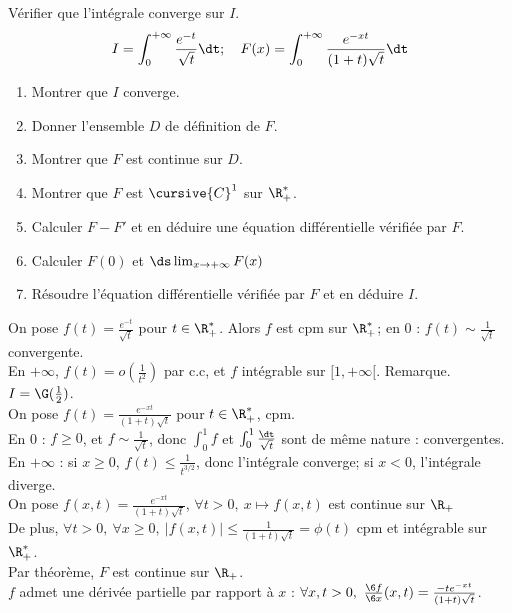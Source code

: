 \documentclass[11pt]{article}
\begin{document}
\begin{ex}{}{}
    Vérifier que l'intégrale converge sur $I$.
    \begin{equation*}
        I=\int_0^{+\infty}\frac{e^{-t}}{\sqrt{t}}\dt; \quad F(x)=\int_0^{+\infty}\frac{e^{-xt}}{(1+t)\sqrt{t}}\dt
    \end{equation*}
    \begin{enumerate}
        \item Montrer que $I$ converge.
        \item Donner l'ensemble $D$ de définition de $F$.
        \item Montrer que $F$ est continue sur $D$.
        \item Montrer que $F$ est $\cursive{C}^1$ sur $\R_+^*$.
        \item Calculer $F-F'$ et en déduire une équation différentielle vérifiée par $F$.  
        \item Calculer $F(0)$ et $\ds\lim_{x\to+\infty} F(x)$
        \item Résoudre l'équation différentielle vérifiée par $F$ et en déduire $I$.
    \end{enumerate}
    \tcblower
     On pose $f(t)=\frac{e^{-t}}{\sqrt{t}}$ pour $t\in\R_+^*$. Alors $f$ est cpm sur $\R_+^*$; en 0 : $f(t)\sim\frac{1}{\sqrt{t}}$ convergente.\\
    En $+\infty$, $f(t)=o(\frac{1}{t^2})$ par c.c, et $f$ intégrable sur $[1,+\infty[$. Remarque. $I=\G(\frac{1}{2})$.\\
     On pose $f(t)=\frac{e^{-xt}}{(1+t)\sqrt{t}}$ pour $t\in\R_+^*$, cpm.\\
    En 0 : $f\geq0$, et $f\sim\frac{1}{\sqrt{t}}$, donc $\int_0^1 f$ et $\int_0^1\frac{\dt}{\sqrt{t}}$ sont de même nature : convergentes.\\
    En $+\infty$ : si $x\geq0$, $f(t)\leq\frac{1}{t^{3/2}}$, donc l'intégrale converge; si $x<0$, l'intégrale diverge.\\
     On pose $f(x,t)=\frac{e^{-xt}}{(1+t)\sqrt{t}}$, $\forall t > 0, ~ x\mapsto f(x,t)$ est continue sur $\R_+$\\
    De plus, $\forall t>0, ~ \forall x \geq 0, ~ |f(x,t)|\leq\frac{1}{(1+t)\sqrt{t}}=\phi(t)$ cpm et intégrable sur $\R_+^*$.\\
    Par théorème, $F$ est continue sur $\R_+$.\\
     $f$ admet une dérivée partielle par rapport à $x$ : $\forall x,t > 0, ~ \frac{\6 f}{\6 x}(x,t)=\frac{-te^{-xt}}{(1+t)\sqrt{t}}$.\\

\end{ex}
\end{document}
